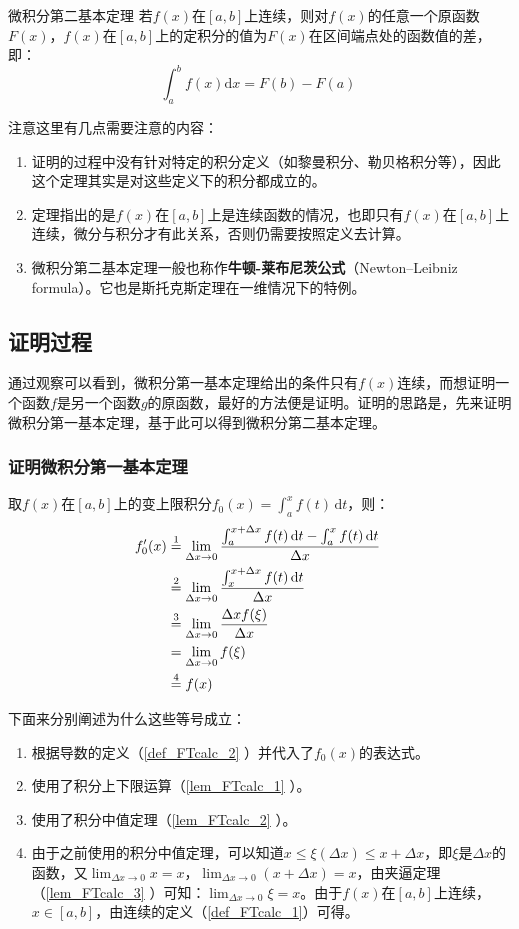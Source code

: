 \begin{theorem}{微积分第二基本定理}
若$f(x)$在$[a,b]$上连续，则对$f(x)$的任意一个原函数$F(x)$，$f(x)$在$[a,b]$上的定积分的值为$F(x)$在区间端点处的函数值的差，即：
$$\int_{a}^{b} f(x)\mathrm {d}x=F(b)-F(a)~$$
\end{theorem}

注意这里有几点需要注意的内容：
\begin{enumerate}
\item 证明的过程中没有针对特定的积分定义（如黎曼积分、勒贝格积分等），因此这个定理其实是对这些定义下的积分都成立的。
\item 定理指出的是$f(x)$在$[a,b]$上是连续函数的情况，也即只有$f(x)$在$[a,b]$上连续，微分与积分才有此关系，否则仍需要按照定义去计算。
\item 微积分第二基本定理一般也称作\textbf{牛顿-莱布尼茨公式}（Newton–Leibniz formula）。它也是斯托克斯定理在一维情况下的特例。
\end{enumerate}

\subsection{证明过程}

通过观察可以看到，微积分第一基本定理给出的条件只有$f(x)$连续，而想证明一个函数$f$是另一个函数$g$的原函数，最好的方法便是证明。证明的思路是，先来证明微积分第一基本定理，基于此可以得到微积分第二基本定理。

\subsubsection{证明微积分第一基本定理}

取$f(x)$在$[a,b]$上的变上限积分$f_0(x)=\int_{a}^{x} f(t)\, \mathrm {d}t$，则：
$$\begin{align*}f_0'(x) &\overset{\mathrm{1}}{=} \lim_{\Delta x\to0}{\int_{a}^{x+\Delta x} f(t)\, \mathrm {d}t-\int_{a}^{x} f(t)\, \mathrm {d}t\over\Delta x}\\ 
&\overset{\mathrm{2}}{=}\lim_{\Delta x\to0}{\int_{x}^{x+\Delta x} f(t)\, \mathrm {d}t\over\Delta x}\\
&\overset{\mathrm{3}}{=}\lim_{\Delta x\to0}{\Delta xf(\xi)\over\Delta x} \\ 
&=\lim_{\Delta x\to0}f(\xi)\\ 
&\overset{\mathrm{4}}{=}f(x)\end{align*}~$$

下面来分别阐述为什么这些等号成立：
\begin{enumerate}
\item 根据导数的定义（\autoref{def_FTcalc_2} ）并代入了$f_0(x)$的表达式。
\item 使用了积分上下限运算（\autoref{lem_FTcalc_1} ）。
\item 使用了积分中值定理（\autoref{lem_FTcalc_2} ）。
\item 由于之前使用的积分中值定理，可以知道$x\leq\xi(\Delta x)\leq x+\Delta x$，即$\xi$是$\Delta x$的函数，又$\lim_{\Delta x\to0}x=x$，$\lim_{\Delta x\to0}(x+\Delta x)=x$，由夹逼定理（\autoref{lem_FTcalc_3} ）可知：$\lim_{\Delta x\to0}\xi=x$。由于$f(x)$在$[a,b]$上连续，$x\in[a,b]$，由连续的定义（\autoref{def_FTcalc_1}）可得。
\end{enumerate}

